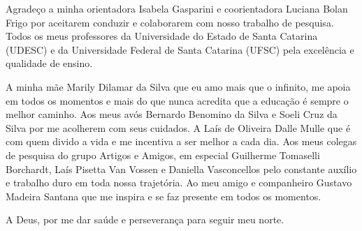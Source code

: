 \begin{agradecimentos}

Agradeço a minha orientadora Isabela Gasparini e coorientadora Luciana Bolan Frigo por aceitarem conduzir e colaborarem com nosso trabalho de pesquisa. Todos os meus professores da Universidade do Estado de Santa Catarina (UDESC) e  da Universidade Federal de Santa Catarina (UFSC) pela excelência e qualidade de ensino.

A minha mãe Marily Dilamar da Silva que eu amo mais que o infinito, me apoia em todos os momentos e mais do que nunca acredita que a educação é sempre o melhor caminho. Aos meus avós Bernardo Benomino da Silva e Soeli Cruz da Silva por me acolherem com seus cuidados. A Laís de Oliveira Dalle Mulle que é com quem divido a vida e me incentiva a ser melhor a cada dia. Aos meus colegas de pesquisa do grupo Artigos e Amigos, em especial Guilherme Tomaselli Borchardt, Laís Pisetta Van Vossen e Daniella Vasconcellos pelo constante auxílio e trabalho duro em toda nossa trajetória. Ao meu amigo e companheiro Gustavo Madeira Santana que me inspira e se faz presente em todos os momentos.

A Deus, por me dar saúde e
perseverança para seguir meu norte.
\end{agradecimentos}
